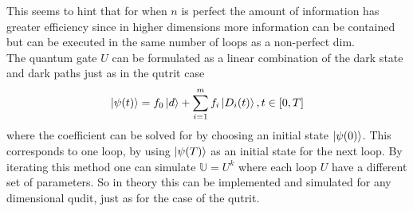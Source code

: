 This seems to hint that for when $n$ is perfect the amount of information has greater efficiency since in higher dimensions more information can be contained but can be executed in the same number of loops as a non-perfect dim. 
\\ 
The quantum gate $U$ can be formulated as a linear combination of the dark state and dark paths just as in the qutrit case
\begin{equation}
\ket{\psi(t)} = f_0\ket{d} + \sum_{i = 1}^{m}f_i\ket{D_i(t)}, t \in [0,T]
\end{equation}
where the coefficient can be solved for by choosing an initial state $\ket{\psi(0)}$. This corresponds to one loop, by using $\ket{\psi(T)}$ as an initial state for the next loop. By iterating this method one can simulate $\mathbb{U} = U^k$ where each loop $U$ have a different set of parameters. So in theory this can be implemented and simulated for any dimensional qudit, just as for the case of the qutrit. 





